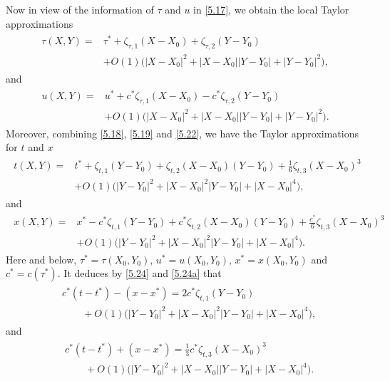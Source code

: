 \documentclass[11pt,reqno]{article}
\newcommand{\fr}{\frac}
\numberwithin{equation}{section}
\begin{document}
Now in view of the information of $\tau$ and $u$ in \eqref{5.17}, we obtain the local Taylor approximations
\begin{align}\label{5.23}
\begin{split}
\tau(X,Y)=&\tau^* +\zeta_{\tau,1}(X-X_0) +\zeta_{\tau,2}(Y-Y_0) \\
&+O(1)\Big(|X-X_0|^2 +|X-X_0||Y-Y_0|+|Y-Y_0|^2\Big),
\end{split}
\end{align}
and
\begin{align}\label{5.23a}
\begin{split}
u(X,Y)=&u^* +c^*\zeta_{\tau,1}(X-X_0) -c^*\zeta_{\tau,2}(Y-Y_0) \\
&+O(1)\Big(|X-X_0|^2 +|X-X_0||Y-Y_0|+|Y-Y_0|^2\Big).
\end{split}
\end{align}
Moreover, combining \eqref{5.18}, \eqref{5.19} and \eqref{5.22}, we have the Taylor approximations for $t$ and $x$
\begin{align}\label{5.24}
\begin{split}
t(X,Y)=&t^* +\zeta_{t,1}(Y-Y_0) +\zeta_{t,2}(X-X_0)(Y-Y_0) +\fr{1}{6}\zeta_{t,3}(X-X_0)^3\\
&+O(1)\Big(|Y-Y_0|^2 +|X-X_0|^2|Y-Y_0|+|X-X_0|^4\Big),
\end{split}
\end{align}
and
\begin{align}\label{5.24a}
\begin{split}
x(X,Y)=&x^* -c^*\zeta_{t,1}(Y-Y_0) +c^*\zeta_{t,2}(X-X_0)(Y-Y_0)+\fr{c^*}{6}\zeta_{t,3}(X-X_0)^3 \\
&+O(1)\Big(|Y-Y_0|^2 +|X-X_0|^2|Y-Y_0|+|X-X_0|^4\Big).
\end{split}
\end{align}
Here and below, $\tau^*=\tau(X_0, Y_0)$, $u^*=u(X_0, Y_0)$, $x^*=x(X_0, Y_0)$ and $c^*=c(\tau^*)$.
It deduces by \eqref{5.24} and \eqref{5.24a} that
\begin{align}\label{5.26}
\begin{split}
&c^*(t-t^*)-(x-x^*)=2c^*\zeta_{t,1}(Y-Y_0) \\
&\qquad +O(1)\Big(|Y-Y_0|^2 +|X-X_0|^2|Y-Y_0|+|X-X_0|^4\Big),
\end{split}
\end{align}
and
\begin{align}\label{5.27}
\begin{split}
&c^*(t-t^*)+(x-x^*)=\fr{1}{3}c^*\zeta_{t,3}(X-X_0)^3\\
&\qquad +O(1)\Big(|Y-Y_0|^2 +|X-X_0||Y-Y_0|+|X-X_0|^4\Big).
\end{split}
\end{align}
\end{document}
